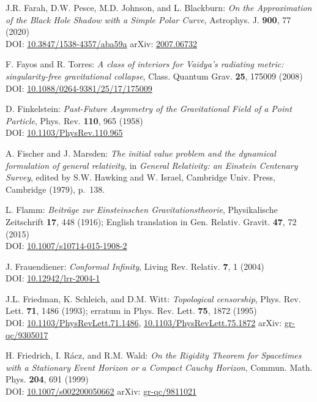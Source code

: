\begin{thebibliography}{123}
J.R. Farah, D.W. Pesce, M.D. Johnson, and L. Blackburn:
{\em On the Approximation of the Black Hole Shadow with a Simple Polar Curve},
Astrophys. J. {\bf 900}, 77 (2020)\\
DOI: \href{https://doi.org/10.3847/1538-4357/aba59a}{10.3847/1538-4357/aba59a}\hfill
arXiv: \href{https://arxiv.org/abs/2007.06732}{2007.06732}

F. Fayos and R. Torres:
{\em A class of interiors for Vaidya's radiating metric: singularity-free gravitational collapse},
Class. Quantum Grav. {\bf 25}, 175009 (2008)\\
DOI: \href{https://doi.org/10.1088/0264-9381/25/17/175009}{10.1088/0264-9381/25/17/175009}

D. Finkelstein:
{\em Past-Future Asymmetry of the Gravitational Field of a Point Particle},
Phys. Rev. {\bf 110}, 965 (1958)\\
DOI: \href{https://doi.org/10.1103/PhysRev.110.965}{10.1103/PhysRev.110.965}

A. Fischer and J. Marsden:
{\em The initial value problem and the dynamical formulation of general relativity},
in {\em General Relativity: an Einstein
Centenary Survey}, edited by S.W. Hawking and W. Israel,
Cambridge Univ. Press, Cambridge (1979), p.~138.

L. Flamm: {\em Beiträge zur Einsteinschen Gravitationstheorie},
Physikalische Zeitschrift {\bf 17}, 448 (1916); English translation in
Gen. Relativ. Gravit. {\bf 47}, 72 (2015)\\
DOI: \href{https://doi.org/10.1007/s10714-015-1908-2}{10.1007/s10714-015-1908-2}

J. Frauendiener:
{\em Conformal Infinity},
Living Rev. Relativ. {\bf 7}, 1 (2004) \\
DOI: \href{https://doi.org/10.12942/lrr-2004-1}{10.12942/lrr-2004-1}

J.L. Friedman, K. Schleich, and D.M. Witt:
{\em Topological censorship},
Phys. Rev. Lett. {\bf 71}, 1486 (1993); erratum in Phys. Rev. Lett. {\bf 75}, 1872 (1995)\\
DOI: \href{https://doi.org/10.1103/PhysRevLett.71.1486}{10.1103/PhysRevLett.71.1486},
\href{https://doi.org/10.1103/PhysRevLett.75.1872}{10.1103/PhysRevLett.75.1872}\hfill
arXiv: \href{https://arxiv.org/abs/gr-qc/9305017}{gr-qc/9305017}

H. Friedrich, I. Rácz, and R.M. Wald:
{\em On the Rigidity Theorem for Spacetimes with a Stationary Event Horizon or a Compact Cauchy Horizon},
Commun. Math. Phys. {\bf 204}, 691 (1999)\\
DOI: \href{https://doi.org/10.1007/s002200050662}{10.1007/s002200050662}\hfill
arXiv: \href{https://arxiv.org/abs/gr-qc/9811021}{gr-qc/9811021}


\end{thebibliography}
